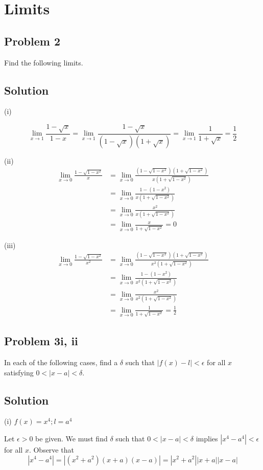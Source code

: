 \section{Limits}
\subsection*{Problem 2}
Find the following limits.

\subsection*{Solution}
(i)

\[\lim_{x\to 1}\frac{1-\sqrt{x}}{1-x}=\lim_{x\to 1}\frac{1-\sqrt{x}}{(1-\sqrt{x})(1+\sqrt{x})}=\lim_{x\to 1}\frac{1}{1+\sqrt{x}}=\frac{1}{2}\]

(ii)
\begin{align*}
\lim_{x\to 0}\frac{1-\sqrt{1-x^2}}{x}&=\lim_{x\to 0}\frac{(1-\sqrt{1-x^2})(1+\sqrt{1-x^2})}{x(1+\sqrt{1-x^2})}\\
&=\lim_{x\to 0}\frac{1-(1-x^2)}{x(1+\sqrt{1-x^2})}\\
&=\lim_{x\to 0}\frac{x^2}{x(1+\sqrt{1-x^2})}\\
&=\lim_{x\to 0}\frac{x}{1+\sqrt{1-x^2}}=0
\end{align*}

(iii)
\begin{align*}
    \lim_{x\to0}\frac{1-\sqrt{1-x^2}}{x^2}&=\lim_{x\to 0}\frac{(1-\sqrt{1-x^2})(1+\sqrt{1-x^2})}{x^2(1+\sqrt{1-x^2})}\\
    &=\lim_{x\to 0}\frac{1-(1-x^2)}{x^2(1+\sqrt{1-x^2})}\\
    &=\lim_{x\to 0}\frac{x^2}{x^2(1+\sqrt{1-x^2})}\\
    &=\lim_{x\to 0}\frac{1}{1+\sqrt{1-x^2}}=\frac{1}{2}
\end{align*}

\subsection*{Problem 3i, ii}
In each of the following cases, find a $\delta$ such that $|f(x)-l|<\epsilon$ for all $x$ satisfying $0<|x-a|<\delta$.

\subsection*{Solution}
(i) $f(x)=x^4; l=a^4$

\vs

Let $\epsilon>0$ be given. We must find $\delta$ such that $0<|x-a|<\delta$ implies $|x^4-a^4|<\epsilon$ for all $x$. Observe that
\[|x^4-a^4|=|(x^2+a^2)(x+a)(x-a)|=|x^2+a^2||x+a||x-a|\]

